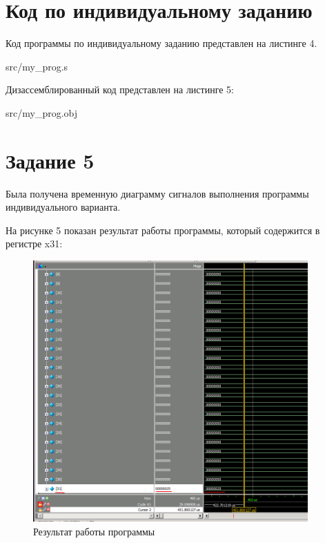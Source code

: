 \section*{Код по индивидуальному заданию}
Код программы по индивидуальному заданию представлен на листинге 4.

\FloatBarrier
\begin{lstinputlisting}[caption=Код индивидуального задания, 
	linerange={1, 33}, basicstyle=\footnotesize\ttfamily, frame=single, breaklines=true]{src/my_prog.s}
\end{lstinputlisting}
\FloatBarrier

Дизассемблированный код представлен на листинге 5:

\FloatBarrier
\begin{lstinputlisting}[caption=Дизассемблированный код индивидуального задания, 
	linerange={1, 41}, basicstyle=\footnotesize\ttfamily, frame=single, breaklines=true]{src/my_prog.obj}
\end{lstinputlisting}
\FloatBarrier


\section*{Задание 5}
Была получена временную диаграмму сигналов выполнения программы индивидуального варианта.

На рисунке 5 показан результат работы программы, который содержится в регистре x31:
\FloatBarrier
\begin{figure}[h]
	\begin{center}
		\includegraphics[width=\linewidth, height=10cm]{inc/result_my.png}
	\end{center}
	\caption{Результат работы программы}
\end{figure}
\FloatBarrier

